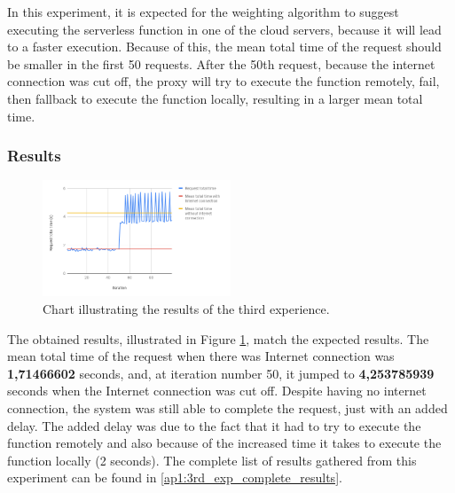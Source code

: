 \documentclass[conference]{IEEEtran}
\begin{document}
In this experiment, it is expected for the weighting algorithm to suggest
executing the serverless function in one of the cloud servers, because it will
lead to a faster execution. Because of this, the mean total time of the request should
be smaller in the first 50 requests. After the 50th request, because the internet
connection was cut off, the proxy will try to execute the function remotely, fail,
then fallback to execute the function locally, resulting in a larger mean total
time. 

\subsubsection{Results}

\begin{figure}[h]
  \begin{center}
    \includegraphics[width=0.5\textwidth]{exp3_chart.png}
    \caption{Chart illustrating the results of the third experience.}
    \label{fig:exp3_chart}
  \end{center}
\end{figure}

The obtained results, illustrated in Figure \ref{fig:exp3_chart}, match the
expected results. The mean total time of the request when there was Internet
connection was \textbf{1,71466602} seconds, and, at iteration number 50, it
jumped to \textbf{4,253785939} seconds when the Internet connection was cut off.
Despite having no internet connection, the system was still able to complete the
request, just with an added delay. The added delay was due to the fact that it had
to try to execute the function remotely and also because of the increased time it
takes to execute the function locally (2 seconds). The complete list of results
gathered from this experiment can be found in \ref{ap1:3rd_exp_complete_results}.
\end{document}

